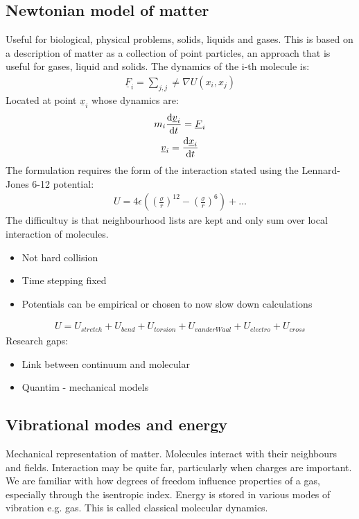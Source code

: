 \documentclass[class=report, crop=false, 12pt,a4paper]{standalone}
\begin{document}
\subsection{Newtonian model of matter}
Useful for biological, physical problems, solids, liquids and gases. This is based on a description of matter as a collection of point particles, an approach that is useful for gases, liquid and solids. The dynamics of the i-th molecule is:
\begin{gather}
	\underline{F}_i = \sum_{j,j} \neq \nabla U\left(x_i,x_j\right)
\end{gather}
Located at point $\underline{x}_i$ whose dynamics are:
\begin{gather}
	m_i \dfrac{\dif \underline{v}_i}{\dif t} = \underline{F}_i\\
	\underline{v}_i = \frac{\dif \underline{x}_i}{\dif t}
\end{gather}
The formulation requires the form of the interaction stated using the Lennard-Jones 6-12 potential:
\begin{gather}
	U = 4 \epsilon \left(\left(\frac{\sigma}{r}\right)^{12} - \left(\frac{\sigma}{r}\right)^6\right) + \dots
\end{gather}
The difficultuy is that neighbourhood lists are kept and only sum over local interaction of molecules.
\begin{itemize}
	\item Not hard collision
	\item Time stepping fixed
	\item Potentials can be empirical or chosen to now slow down calculations
\end{itemize}
\begin{gather}
	U = U_{stretch} + U_{bend} + U_{torsion} + U_{vanderWaal} + U_{electro} + U_{cross}
\end{gather}
Research gaps:
\begin{itemize}
	\item Link between continuum and molecular
	\item Quantim - mechanical models
\end{itemize}
\subsection{Vibrational modes and energy}
Mechanical representation of matter. Molecules interact with their neighbours and fields. Interaction may be quite far, particularly when charges are important. We are familiar with how degrees of freedom influence properties of a gas, especially through the isentropic index. Energy is stored in various modes of vibration e.g. gas. This is called classical molecular dynamics.
\end{document}
